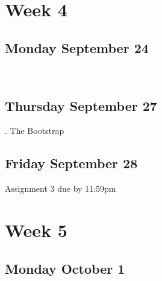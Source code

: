 \documentclass[]{book}
\let\originaltabular\tabular
\let\endoriginaltabular\endtabular
\renewenvironment{tabular}[1]{%
  \begingroup%
  \centering%
  \originaltabular{#1}}%
  {\endoriginaltabular\endgroup}
\theoremstyle{definition}
\theoremstyle{definition}
\theoremstyle{definition}
\theoremstyle{remark}
\begin{document}
\section{Week 4}\label{week-4}

\subsection{Monday September 24}\label{monday-september-24}

\begin{table}[H]
\centering
\begin{tabular}{l}
\hline
\\
\hline
\end{tabular}
\end{table}

\subsection{Thursday September 27}\label{thursday-september-27}

\begin{table}[H]
\centering
\begin{tabular}{l}
. The Bootstrap\\
\hline
\end{tabular}
\end{table}

\subsection{Friday September 28}\label{friday-september-28}

\begin{table}[H]
\centering
\begin{tabular}{l}
\hline
Assignment 3 due by 11:59pm\\
\hline
\end{tabular}
\end{table}

\section{Week 5}\label{week-5}

\subsection{Monday October 1}\label{monday-october-1}

\begin{table}[H]
\centering
\begin{tabular}{l}
\hline
\\
\hline
\end{tabular}
\end{table}
\end{document}

